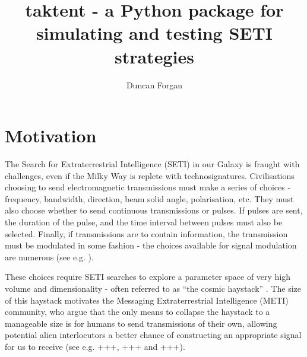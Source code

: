 \documentclass[RNAAS]{aastex62}
\begin{document}
\title{taktent - a Python package for simulating and testing SETI strategies}


\author[0000-0003-1175-4388]{Duncan Forgan}


\keywords{+++}


\section{Motivation}

The Search for Extraterrestrial Intelligence (SETI) in our Galaxy is fraught with challenges, even if the Milky Way is replete with technosignatures.  Civilisations choosing to send electromagnetic transmissions must make a series of choices - frequency, bandwidth, direction, beam solid angle, polarisation, etc.  They must also choose whether to send continuous transmissions or pulses.  If pulses are sent, the duration of the pulse, and the time interval between pulses must also be selected.  Finally, if transmissions are to contain information, the transmission must be modulated in some fashion - the choices available for signal modulation are numerous (see e.g. \citealt{Messerschmitt2013,Messerschmitt2015}).  

These choices require SETI searches to explore a parameter space of very high volume and dimensionality - often referred to as ``the cosmic haystack'' \citep{TarterPlanetsLife2007,Wright2018a}.  The size of this haystack motivates the Messaging Extraterrestrial Intelligence (METI) community, who argue that the only means to collapse the haystack to a manageable size is for humans to send transmissions of their own, allowing potential alien interlocutors a better chance of constructing an appropriate signal for us to receive (see e.g. +++, +++ and +++).
\end{document}
